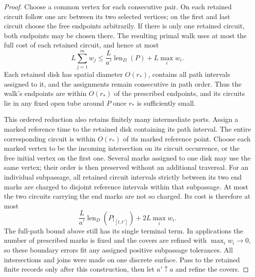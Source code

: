 \begin{proof}
Choose a common vertex for each consecutive pair.  On each retained
circuit follow one arc between its two selected vertices; on the
first and last circuit choose the free endpoints arbitrarily.  If
there is only one retained circuit, both endpoints may be chosen
there.  The resulting primal walk uses at most the full cost of
each retained circuit, and hence at most
\[
 L\sum_{j=1}^m w_j
 \le \frac{L}{a'}\operatorname{len}_D(P)+L\max_iw_i.
\]
Each retained disk has spatial diameter $O(r_*)$, contains all path
intervals assigned to it, and the assignments remain consecutive in
path order.  Thus the walk's endpoints are within $O(r_*)$ of the
prescribed endpoints, and its circuits lie in any fixed open tube
around $P$ once $r_*$ is sufficiently small.

This ordered reduction also retains finitely many intermediate ports.
Assign a marked reference time to the retained disk containing its
path interval.  The entire corresponding circuit is within $O(r_*)$
of its marked reference point.  Choose each marked vertex to be the incoming intersection on its
circuit occurrence, or the free initial vertex on the first one.
Several marks assigned to one disk may use the same vertex; their
order is then preserved without an additional traversal.  For an individual subpassage,
all retained circuit intervals strictly between its two end marks
are charged to disjoint reference intervals within that subpassage.
At most the two circuits carrying the end marks are not so charged.
Its cost is therefore at most
\[
 \frac{L}{a'}\operatorname{len}_D(P|_{[t,t']})
       +2L\max_iw_i.
\]
The full-path bound above still has its single terminal term.  In
applications the number of prescribed marks is fixed and the covers
are refined with $\max_iw_i\to0$, so these boundary errors fit any
assigned positive subpassage tolerances.  All intersections and joins
were made on one discrete surface.  Pass to the retained finite
records only after this construction, then let $a'\uparrow a$ and
refine the covers.


\end{proof}
